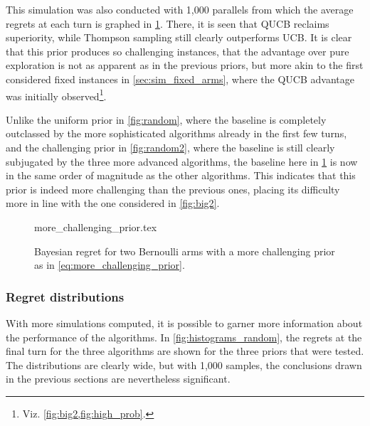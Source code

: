 This simulation was also conducted with 1,000 parallels from which the average regrets at each turn is graphed in \cref{fig:random3}.
There, it is seen that QUCB reclaims superiority, while Thompson sampling still clearly outperforms UCB.
It is clear that this prior produces so challenging instances, that the advantage over pure exploration is not as apparent as in the previous priors, but more akin to the first considered fixed instances in \cref{sec:sim_fixed_arms}, where the QUCB advantage was initially observed\footnote{Viz. \cref{fig:big2,fig:high_prob}.}.

Unlike the uniform prior in \cref{fig:random}, where the baseline is completely outclassed by the more sophisticated algorithms already in the first few turns, and the challenging prior in \cref{fig:random2}, where the baseline is still clearly subjugated by the three more advanced algorithms, the baseline here in \cref{fig:random3} is now in the same order of magnitude as the other algorithms.
This indicates that this prior is indeed more challenging than the previous ones, placing its difficulty more in line with the one considered in \cref{fig:big2}.

\begin{figure}[p]
    \centering
    \newcommand{\myoptions}{
        width=10cm,
        height=8cm,
        xlabel={Kiloturn},
        ylabel={Regret},
        legend entries={Baseline, UCB, QUCB, Thompson},
        legend pos=north west,
        legend cell align=left,
        mystyle,
    }
    {more_challenging_prior.tex}
    \caption[
        Bayesian regret for two Bernoulli arms, more challenging prior.
    ]
    {
        Bayesian regret for two Bernoulli arms with a more challenging prior as in \cref{eq:more_challenging_prior}.
    }
    \label{fig:random3}
\end{figure}

\pagebreak\clearpage

\vspace*{2cm plus 1cm minus 1cm}
\subsubsection{Regret distributions}
With more simulations computed, it is possible to garner more information about the performance of the algorithms.
In \cref{fig:histograms_random}, the regrets at the final turn for the three algorithms are shown for the three priors that were tested.
The distributions are clearly wide, but with 1,000 samples, the conclusions drawn in the previous sections are nevertheless significant.

